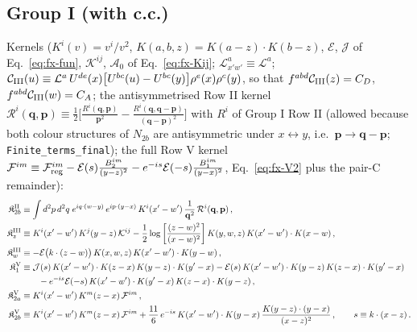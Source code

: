 \documentclass[9pt]{article}
\numberwithin{equation}{section}
\begin{document}
{\subsection{Group I (with c.c.)}
\noindent Kernels ($K^{i}(v)=v^{i}/v^{2}$, $K(a,b,z)=K(a-z)\cdot K(b-z)$, $\mathcal{E}$, $\mathcal{J}$ of Eq.~\eqref{eq:fx-fun}, $\mathcal{K}^{ij}$, $\mathcal{A}_{0}$ of Eq.~\eqref{eq:fx-Kij}; $\mathcal{L}^{a}_{x'w'}\equiv\mathcal{L}^{a}$; $\mathcal{C}_{\rm III}(u)\equiv\mathcal{L}^{a}\,U^{de}(x)\big[U^{bc}(u)-U^{bc}(y)\big]\rho^{e}(x)\rho^{c}(y)$, so that $f^{abd}\mathcal{C}_{\rm III}(z)=C_{D}$, $f^{abd}\mathcal{C}_{\rm III}(w)=C_{A}$; the antisymmetrised Row II kernel $\mathcal{R}^{i}(\mathbf{q},\mathbf{p})\equiv\frac12\big[\frac{R^{i}(\mathbf{q},\mathbf{p})}{\mathbf{p}^{2}}-\frac{R^{i}(\mathbf{q},\mathbf{q}-\mathbf{p})}{(\mathbf{q}-\mathbf{p})^{2}}\big]$ with $R^{i}$ of Group I Row II (allowed because both colour structures of $N_{2b}$ are antisymmetric under $x\leftrightarrow y$, i.e.\ $\mathbf{p}\to\mathbf{q}-\mathbf{p}$; \texttt{Finite\_terms\_final}); the full Row V kernel $\mathcal{F}^{im}\equiv\mathcal{F}^{im}_{\rm reg}-\mathcal{E}(s)\frac{B_{2}^{im}}{(y-z)^{2}}-e^{-is}\mathcal{E}(-s)\frac{B_{1}^{im}}{(y-x)^{2}}$, Eq.~\eqref{eq:fx-V2} plus the pair-C remainder):
\begin{align}
\mathfrak{K}^{\rm II}_{2b}&\equiv\int d^{2}p\,d^{2}q\;e^{iq\cdot(w-y)}\,e^{ip\cdot(y-x)}\,K^{i}(x'-w')\,\frac{1}{\mathbf{q}^{2}}\,\mathcal{R}^{i}(\mathbf{q},\mathbf{p})\,,\notag\\
\mathfrak{K}^{\rm III}_{z}&\equiv K^{i}(x'-w')\,K^{j}(y-z)\,\mathcal{K}^{ij}-\frac12\log\left[\frac{(z-w)^{2}}{(x-w)^{2}}\right]K(y,w,z)\,K(x'-w')\cdot K(x-w)\,,\notag\\
\mathfrak{K}^{\rm III}_{w}&\equiv-\mathcal{E}\big(k\cdot(z-w)\big)\,K(x,w,z)\,K(x'-w')\cdot K(y-w)\,,\notag\\
\mathfrak{K}^{\rm V}_{1}&\equiv\mathcal{J}(s)\,K(x'-w')\cdot K(z-x)\,K(y-z)\cdot K(y'-x)-\mathcal{E}(s)\,K(x'-w')\cdot K(y-z)\,K(z-x)\cdot K(y'-x)\notag\\&\qquad-e^{-is}\mathcal{E}(-s)\,K(x'-w')\cdot K(y'-x)\,K(z-x)\cdot K(y-z)\,,\notag\\
\mathfrak{K}^{\rm V}_{2a}&\equiv K^{i}(x'-w')\,K^{m}(z-x)\,\mathcal{F}^{im}\,,\notag\\
\mathfrak{K}^{\rm V}_{2b}&\equiv K^{i}(x'-w')\,K^{m}(z-x)\,\mathcal{F}^{im}+\frac{11}{6}\,e^{-is}\,K(x'-w')\cdot K(y-x)\,\frac{K(y-z)\cdot(y-x)}{(x-z)^{2}}\,,\qquad s\equiv k\cdot(x-z)\,.\notag
\end{align}

}
\end{document}

